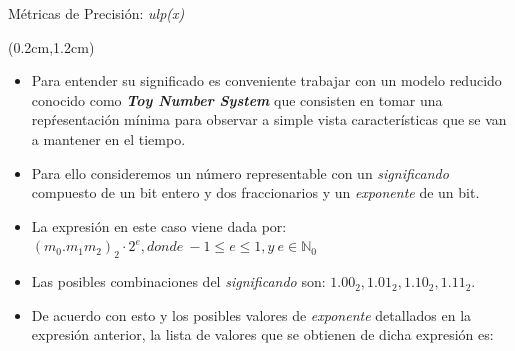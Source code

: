 \documentclass[usenames,table,dvipsnames,aspectratio=169]{beamer}
\begin{document}
\begin{frame}{Métricas de Precisión: \textit{ulp(x)}}
 \begin{textblock*}{\textwidth}(0.2cm,1.2cm)
  \begin{itemize} [<+(1)->]\justifying \parskip .2cm
   \item Para entender su significado es conveniente trabajar con un modelo reducido conocido como \textbf{\textit{Toy Number System}} que consisten en tomar una repŕesentación mínima para observar a simple vista características que se van a mantener en el tiempo.
   \item Para ello consideremos un número representable con un \textit{significando} compuesto de un bit entero y dos fraccionarios y un \textit{exponente} de un bit.
   \item La expresión en este caso viene dada por:\\
        \centering $(m_{0}.m_{1}m_{2})_{2} \cdot 2^{e}, donde~ -1\leq e \leq 1, y~ e\in \mathbb{N}_{0}$
   \item Las posibles combinaciones del \textit{significando} son: $1.00_{2}, 1.01_{2}, 1.10_{2}, 1.11_{2}$.
   \item De acuerdo con esto y los posibles valores de \textit{exponente} detallados en la expresión anterior, la lista de valores que se obtienen de dicha expresión es:\\
   \end{itemize}
 \end{textblock*}
\end{frame}
\end{document}
